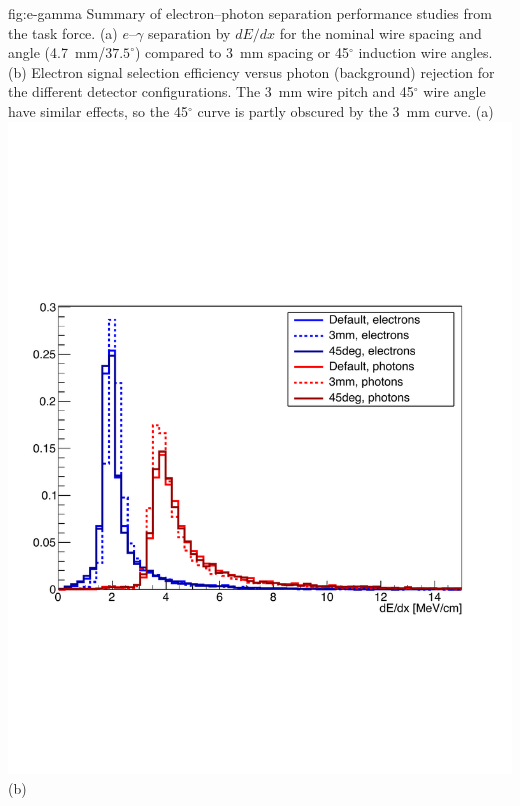 \begin{itemize}
\begin{dunefigure}{fig:e-gamma}
{Summary of electron--photon separation performance studies from the   task force. (a) $e$--$\gamma$ separation by $dE/dx$ for the nominal wire spacing and angle (\SI{4.7}{mm}/$37.5^\circ$) compared to \SI{3}{mm} spacing or 45$^\circ$ induction wire angles. (b) Electron signal selection efficiency versus photon (background) rejection for the different detector configurations. The \SI{3}{mm} wire pitch and 45$^\circ$ wire angle have similar effects, so the 45$^\circ$ curve is partly obscured by the \SI{3}{mm} curve.}
(a)
\includegraphics[height=0.24\textheight]{graphics/sp-apa-e-gamma-dEdx.pdf} \qquad
(b)

\end{dunefigure}
\end{itemize}
